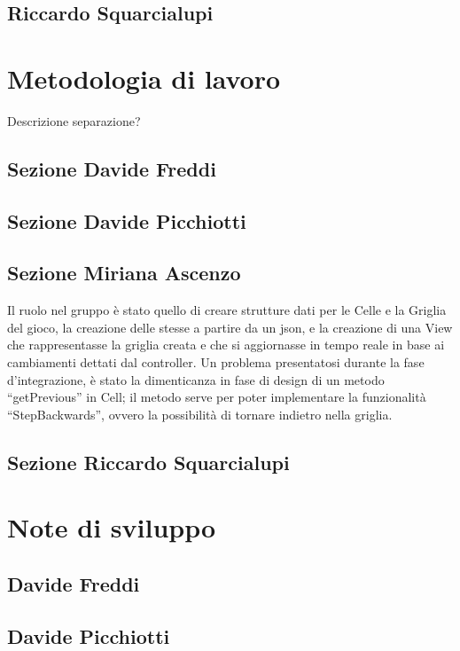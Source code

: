 \documentclass[a4paper,12pt]{report}
\begin{document}
\subsection{Riccardo Squarcialupi}

\section{Metodologia di lavoro}

Descrizione separazione?

\subsection{Sezione Davide Freddi}
\subsection{Sezione Davide Picchiotti}
\subsection{Sezione Miriana Ascenzo}

Il ruolo nel gruppo è stato quello di creare strutture dati per le Celle e la Griglia del gioco, la creazione delle stesse a partire da un json, e la creazione di una View che rappresentasse la griglia creata e che si aggiornasse in tempo reale in base ai cambiamenti dettati dal controller.
%
Un problema presentatosi durante la fase d’integrazione, è stato la dimenticanza in fase di design di un metodo “getPrevious” in Cell; il metodo serve per poter implementare la funzionalità “StepBackwards”, ovvero la possibilità di tornare indietro nella griglia.

\subsection{Sezione Riccardo Squarcialupi}


\section{Note di sviluppo}

\subsection{Davide Freddi}
\subsection{Davide Picchiotti}
\end{document}
